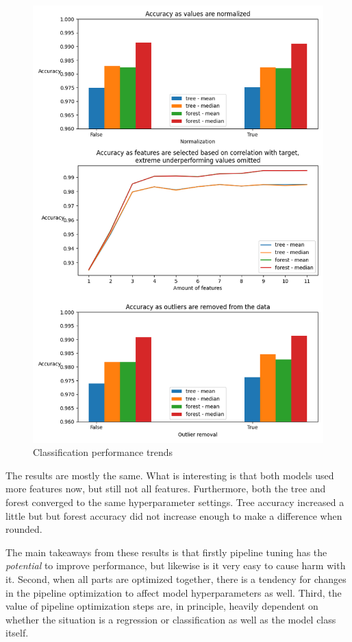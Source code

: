 \documentclass[12pt, letterpaper]{article}
\begin{document}
\begin{figure}[H]
    \centering
    \includegraphics[scale=0.7]{classification_performance_100.png}
    \caption{Classification performance trends}
    \label{cls_plt_100} %
\end{figure}

The results are mostly the same. What is interesting is that both models used more features now, but still not all features. Furthermore, both the tree and forest converged to the same hyperparameter settings. Tree accuracy increased a little but but forest accuracy did not increase enough to make a difference when rounded.


The main takeaways from these results is that firstly pipeline tuning has the \emph{potential} to improve performance, but likewise is it very easy to cause harm with it. Second, when all parts are optimized together, there is a tendency for changes in the pipeline optimization to affect model hyperparameters as well. Third, the value of pipeline optimization steps are, in principle, heavily dependent on whether the situation is a regression or classification as well as the model class itself.
\end{document}
